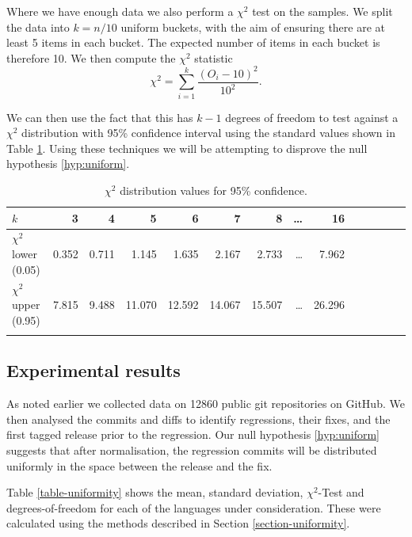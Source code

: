 \documentclass[pdflatex, sn-mathphys, referee]{sn-jnl}%
\theoremstyle{thmstyleone}%
\theoremstyle{thmstyletwo}%
\theoremstyle{thmstylethree}%
\theoremstyle{thmstyleone}
\begin{document}
Where we have enough data we also perform a $\chi^2$ test on the samples. We split the data into $k = n / 10$ uniform buckets, with the aim of ensuring there are at least 5 items in each bucket. The expected number of items in each bucket is therefore 10. We then compute the $\chi^2$ statistic \cite{knuth2014}
$$
\chi^2 = \sum_{i = 1}^k \frac{(O_i - 10)^2}{10^2} .
$$

We can then use the fact that this has $k - 1$ degrees of freedom to test against a $\chi^2$ distribution with 95\% confidence interval using the standard values shown in Table \ref{table-chi-squared}. Using these techniques we will be attempting to disprove the null hypothesis \ref{hyp:uniform}.

\begin{table}[ht]
\begin{center}
\begin{minipage}{\textwidth}
\begin{tabular*}{\textwidth}{l r r r r r r r r r r r r r}
\toprule%
$k$ & 3 & 4 & 5 & 6 & 7 & 8 & \ldots & 16 \\
\midrule
$\chi^2$ lower (0.05) & 0.352 & 0.711 & 1.145 & 1.635 & 2.167 & 2.733 & \ldots & 7.962 \\
$\chi^2$ upper (0.95) & 7.815 & 9.488 & 11.070 & 12.592 & 14.067 & 15.507 & \ldots & 26.296 \\
\botrule
\end{tabular*}
\caption{\label{table-chi-squared}$\chi^2$ distribution values for 95\% confidence.}
\end{minipage}
\end{center}
\end{table}

\subsection{Experimental results}

As noted earlier we collected data on 12860 public git repositories on GitHub. We then analysed the commits and diffs to identify regressions, their fixes, and the first tagged release prior to the regression. Our null hypothesis \ref{hyp:uniform} suggests that after normalisation, the regression commits will be distributed uniformly in the space between the release and the fix.

Table \ref{table-uniformity} shows the mean, standard deviation, $\chi^2$-Test and degrees-of-freedom for each of the languages under consideration. These were calculated using the methods described in Section \ref{section-uniformity}.
\end{document}
